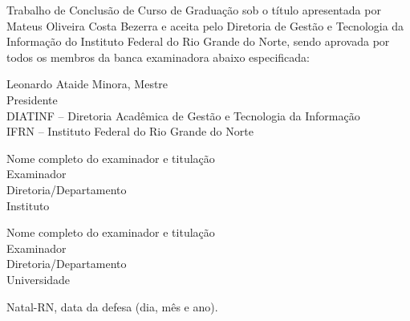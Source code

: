 \begin{folhadeaprovacao}
	\setlength{\ABNTsignthickness}{0.4pt}
	\setlength{\ABNTsignwidth}{10cm}

	\noindent
	Trabalho de Conclusão de Curso de Graduação sob o título
	\textit{\ABNTtitulodata} apresentada por Mateus Oliveira Costa Bezerra e aceita pelo Diretoria
	de Gestão e Tecnologia da Informação do Instituto Federal do Rio Grande do
	Norte, sendo aprovada por todos os membros da banca examinadora abaixo especificada:

	\assinatura
	{
		Leonardo Ataide Minora, Mestre   			                  \\
		{\small Presidente}											          \smallskip\\
		{\footnotesize
			DIATINF -- Diretoria Acadêmica de Gestão e Tecnologia da Informação		   \\
		  	IFRN -- Instituto Federal do Rio Grande do Norte
		}
   }

   \assinatura
	{
      Nome completo do examinador e titulação   			                  \\
		{\small Examinador}											          \smallskip\\
		{\footnotesize
			Diretoria/Departamento		\\
		  	Instituto
		}
   }

   \assinatura
	{
      Nome completo do examinador e titulação   			                  \\
		{\small Examinador}											          \smallskip\\
		{\footnotesize
			Diretoria/Departamento		\\
		  	Universidade
		}
	}

	\vfill

	\begin{center}
		Natal-RN, data da defesa (dia, mês e ano).
	\end{center}
\end{folhadeaprovacao}
